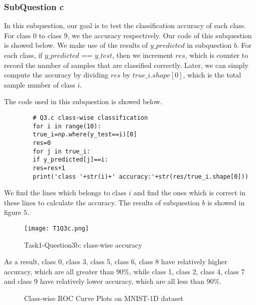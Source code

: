 \documentclass[conference]{IEEEtran}
\begin{document}
	
	
	\subsubsection{SubQuestion c}
	In this subquestion, our goal is to test the classification accuracy of each class. For class $0$ to class $9$, we the accuracy respectively. Our code of this subquestion is showed below. We make use of the results of $y\_predicted$ in subquestion $b$. For each class, if $y\_predicted$ == $y\_test$, then we increment $res$, which is counter to record the number of samples that are classified correctly. Later, we can simply compute the accuracy by dividing $res$ by $true\_i.shape[0]$, which is the total sample number of class $i$.\par
	The code used in this subquestion is showed below.
	\begin{lstlisting}
		# Q3.c class-wise classification
		for i in range(10):
		true_i=np.where(y_test==i)[0]
		res=0
		for j in true_i:
		if y_predicted[j]==i:
		res=res+1
		print('class '+str(i)+' accuracy:'+str(res/true_i.shape[0]))
	\end{lstlisting} \par 
	We find the lines which belongs to class $i$ and find the ones which is correct in these lines to calculate the accuracy. The results of subquestion $b$ is showed in figure $5$.\par
	\begin{figure}[h] 
		\centering
		\texttt{[image: T1Q3c.png]}
		\caption{Task1-Question3b: class-wise accuracy} 
		\label{Fig.t1q3c} 
	\end{figure}
	
	
	As a result, class 0, class 3, class 5, class 6, class 8 have relatively higher accuracy, which are all greater than $90\%$, while class 1, class 2, class 4, class 7 and class 9 have relatively lower accuracy, which are all less than $90\%$.
	
	\begin{figure}[t]
		\centering  %
		
		\caption{Class-wise ROC Curve Plots on MNIST-1D dataset}
		\label{Fig.ba}
	\end{figure}
\end{document}
